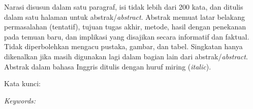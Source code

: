 




\vspace{0.5cm}

Narasi disusun dalam satu paragraf, isi tidak lebih dari 200 kata, dan ditulis
dalam satu halaman untuk abstrak/\textit{abstract}. Abstrak memuat latar
belakang permasalahan (tentatif), tujuan tugas akhir, metode, hasil dengan
penekanan pada temuan baru, dan implikasi yang disajikan secara informatif dan
faktual. Tidak diperbolehkan mengacu pustaka, gambar, dan tabel. Singkatan hanya
dikenalkan jika masih digunakan lagi dalam bagian lain dari
abstrak/\textit{abstract}. Abstrak dalam bahasa Inggris ditulis dengan huruf
miring (\textit{italic}).

\vspace{0.48cm}

\noindent\hangindent=2cm
Kata kunci: \KataKunci

\begin{otherlanguage}{english}
\itshape
\noindent\hangindent=2cm
Keywords: \Keywords
\par
\end{otherlanguage}
